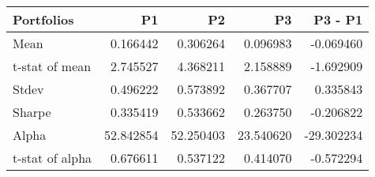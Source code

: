 \begin{tabular}{lrrrr}
\toprule
Portfolios & P1 & P2 & P3 & P3 - P1 \\
\midrule
Mean & 0.166442 & 0.306264 & 0.096983 & -0.069460 \\
t-stat of mean & 2.745527 & 4.368211 & 2.158889 & -1.692909 \\
Stdev & 0.496222 & 0.573892 & 0.367707 & 0.335843 \\
Sharpe & 0.335419 & 0.533662 & 0.263750 & -0.206822 \\
Alpha & 52.842854 & 52.250403 & 23.540620 & -29.302234 \\
t-stat of alpha & 0.676611 & 0.537122 & 0.414070 & -0.572294 \\
\bottomrule
\end{tabular}
